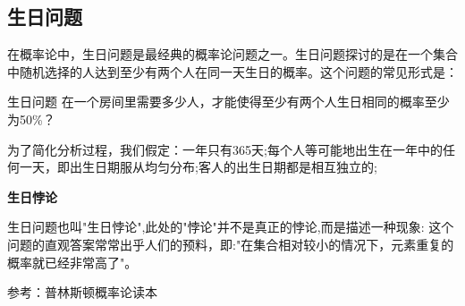 
\subsection{生日问题}

在概率论中，生日问题是最经典的概率论问题之一。生日问题探讨的是在一个集合中随机选择的人达到至少有两个人在同一天生日的概率。这个问题的常见形式是：

\begin{example}{生日问题}
在一个房间里需要多少人，才能使得至少有两个人生日相同的概率至少为50\%？
\end{example}

为了简化分析过程，我们假定：一年只有365天;每个人等可能地出生在一年中的任何一天，即出生日期服从均匀分布;客人的出生日期都是相互独立的;
 


\textbf{生日悖论}

生日问题也叫"生日悖论",此处的"悖论"并不是真正的悖论,而是描述一种现象: 这个问题的直观答案常常出乎人们的预料，即:"在集合相对较小的情况下，元素重复的概率就已经非常高了"。


参考：普林斯顿概率论读本